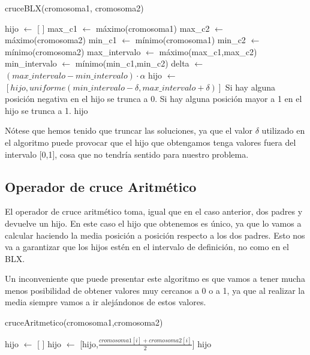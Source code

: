 \documentclass[12pt,a4paper]{article}
\begin{document}
	\begin{algorithm}
		\caption{cruceBLX(cromosoma1, cromosoma2)}
		\begin{algorithmic}
			\STATE hijo $\leftarrow$ [ ]
			\STATE max\_c1 $\leftarrow$ máximo(cromosoma1)
			\STATE max\_c2 $\leftarrow$ máximo(cromosoma2)
			\STATE min\_c1 $\leftarrow$ mínimo(cromosoma1)
			\STATE min\_c2 $\leftarrow$ mínimo(cromosoma2)
			\STATE max\_intervalo $\leftarrow$ máximo(max\_c1,max\_c2)
			\STATE min\_intervalo $\leftarrow$ mínimo(min\_c1,min\_c2)
			\STATE delta $\leftarrow$ $(max\_intervalo-min\_intervalo)\cdot \alpha$
				\STATE hijo $\leftarrow$ $[hijo,uniforme(min\_intervalo - \delta, max\_intervalo + \delta)]$
			\ENDFOR
			\STATE Si hay alguna posición negativa en el hijo se trunca a 0.
			\STATE Si hay alguna posición mayor a 1 en el hijo se trunca a 1.
			\RETURN hijo
		\end{algorithmic}
	\end{algorithm}
	
	Nótese que hemos tenido que truncar las soluciones, ya que el valor $\delta$ utilizado en el algoritmo puede provocar que el hijo que obtengamos tenga valores fuera del intervalo [0,1], cosa que no tendría sentido para nuestro problema.
	
	\subsection{Operador de cruce Aritmético}
	
	El operador de cruce aritmético toma, igual que en el caso anterior, dos padres y devuelve un hijo. En este caso el hijo que obtenemos es único, ya que lo vamos a calcular haciendo la media posición a posición respecto a los dos padres. Esto nos va a garantizar que los hijos estén en el intervalo de definición, no como en el BLX.
	
	Un inconveniente que puede presentar este algoritmo es que vamos a tener mucha menos posibilidad de obtener valores muy cercanos a 0 o a 1, ya que al realizar la media siempre vamos a ir alejándonos de estos valores.
	
	\begin{algorithm}
		\caption{cruceAritmetico(cromosoma1,cromosoma2)}
		\begin{algorithmic}
			\STATE hijo $\leftarrow$ [ ]
			\FOR{i=0 , ... , longitud(cromosoma1)}
				\STATE hijo $\leftarrow$ [hijo,$\frac{cromosoma1[i]+cromosoma2[i]}{2}$]
			\ENDFOR
			\RETURN hijo
		\end{algorithmic}
	\end{algorithm}
	
\end{document}
